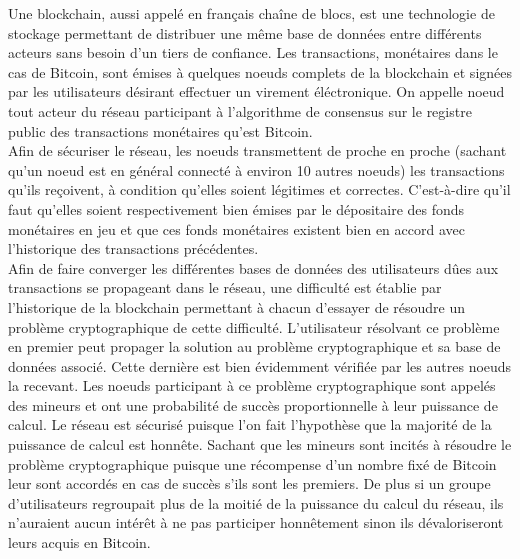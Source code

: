 \documentclass[12pt,a4paper]{article}
\begin{document}
	Une blockchain, aussi appelé en français chaîne de blocs, est une technologie de stockage permettant de distribuer une même base de données entre différents acteurs sans besoin d'un tiers de confiance. Les transactions, monétaires dans le cas de Bitcoin, sont émises à quelques noeuds complets de la blockchain et signées par les utilisateurs désirant effectuer un virement éléctronique. On appelle noeud tout acteur du réseau participant à l'algorithme de consensus sur le registre public des transactions monétaires qu'est Bitcoin.\\ %
	Afin de sécuriser le réseau, les noeuds transmettent de proche en proche (sachant qu'un noeud est en général connecté à environ 10 autres noeuds) les transactions qu'ils reçoivent, à condition qu'elles soient légitimes et correctes. C'est-à-dire qu'il faut qu'elles soient respectivement bien émises par le dépositaire des fonds monétaires en jeu et que ces fonds monétaires existent bien en accord avec l'historique des transactions précédentes.\\
	Afin de faire converger les différentes bases de données des utilisateurs dûes aux transactions se propageant dans le réseau, une difficulté est établie par l'historique de la blockchain permettant à chacun d'essayer de résoudre un problème cryptographique de cette difficulté. L'utilisateur résolvant ce problème en premier peut propager la solution au problème cryptographique et sa base de données associé. Cette dernière est bien évidemment vérifiée par les autres noeuds la recevant. Les noeuds participant à ce problème cryptographique sont appelés des mineurs et ont une probabilité de succès proportionnelle à leur puissance de calcul. Le réseau est sécurisé puisque l'on fait l'hypothèse que la majorité de la puissance de calcul est honnête. Sachant que les mineurs sont incités à résoudre le problème cryptographique puisque une récompense d'un nombre fixé de Bitcoin leur sont accordés en cas de succès s'ils sont les premiers. De plus si un groupe d'utilisateurs regroupait plus de la moitié de la puissance du calcul du réseau, ils n'auraient aucun intérêt à ne pas participer honnêtement sinon ils dévaloriseront leurs acquis en Bitcoin.\\%
\end{document}
